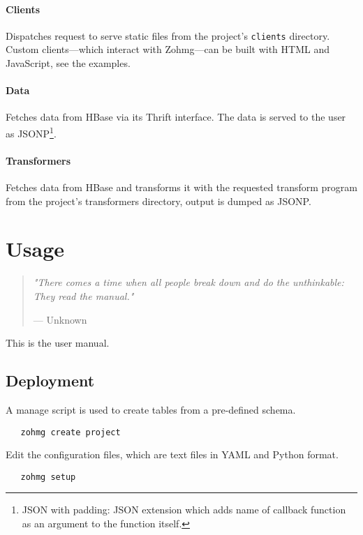 \documentclass[a4paper,10pt]{book}
\newcommand{\chapterquote}[2] {
\begin{quote}
\textit{"{#1}"}

--- {#2}
\end{quote}

\vspace{24pt}
}
\begin{document}
\subsubsection{Clients}

Dispatches request to serve static files from the project's
\texttt{clients} directory. Custom clients---which interact with Zohmg---can
be built with HTML and JavaScript, see the examples.


\subsubsection{Data}

Fetches data from HBase via its Thrift interface. The data is served to the
user as JSONP\footnote{JSON with padding: JSON extension which adds name of
callback function as an argument to the function itself.}.


\subsubsection{Transformers}

Fetches data from HBase and transforms it with the requested transform
program from the project's transformers directory, output is
dumped as JSONP.





\chapter{Usage}

\chapterquote{There comes a time when all people break down and do the
unthinkable: They read the manual.}{Unknown}

This is the user manual.

\section{Deployment}

A manage script is used to create tables from a pre-defined schema.

\begin{verbatim}
   zohmg create project
\end{verbatim}

\noindent Edit the configuration files, which are text files in YAML and
Python format.

\begin{verbatim}
   zohmg setup
\end{verbatim}
\end{document}
